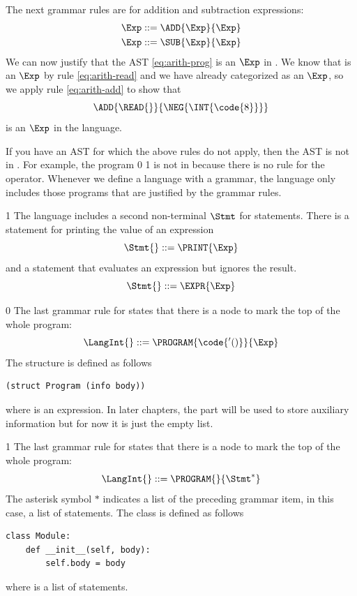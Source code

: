 \documentclass[7x10,nocrop]{TimesAPriori_MIT}%
\def\racketEd{0}
\def\pythonEd{1}
\def\edition{0}
\newcommand{\racket}[1]{{\if\edition\racketEd{#1}\fi}}
\newcommand{\python}[1]{{\if\edition\pythonEd #1\fi}}
\begin{document}
The next grammar rules are for addition and subtraction expressions:
\begin{align}
  \Exp &::= \ADD{\Exp}{\Exp} \label{eq:arith-add}\\
  \Exp &::= \SUB{\Exp}{\Exp} \label{eq:arith-sub}
\end{align}
We can now justify that the AST \eqref{eq:arith-prog} is an $\Exp$ in
\LangInt{}.  We know that \READ{} is an $\Exp$ by rule
\eqref{eq:arith-read} and we have already categorized
 as an $\Exp$, so we apply rule \eqref{eq:arith-add}
to show that
\[
\ADD{\READ{}}{\NEG{\INT{\code{8}}}}
\]
is an $\Exp$ in the \LangInt{} language.

If you have an AST for which the above rules do not apply, then the
AST is not in \LangInt{}. For example, the program \racket{} \python{} is not in \LangInt{}
because there is no rule for the \key{*} operator.  Whenever we
define a language with a grammar, the language only includes those
programs that are justified by the grammar rules.

{\if\edition\pythonEd
The language \LangInt{} includes a second non-terminal $\Stmt$ for statements.
There is a statement for printing the value of an expression
\[
\Stmt{} ::= \PRINT{\Exp}
\]
and a statement that evaluates an expression but ignores the result.
\[
\Stmt{} ::= \EXPR{\Exp}
\]
\fi}

{\if\edition\racketEd
The last grammar rule for \LangInt{} states that there is a
 node to mark the top of the whole program:
\[
  \LangInt{} ::= \PROGRAM{\code{'()}}{\Exp}
\]
The  structure is defined as follows
\begin{lstlisting}
(struct Program (info body))
\end{lstlisting}
where  is an expression. In later chapters, the 
part will be used to store auxiliary information but for now it is
just the empty list.
\fi}

{\if\edition\pythonEd
The last grammar rule for \LangInt{} states that there is a
 node to mark the top of the whole program:
\[
  \LangInt{} ::= \PROGRAM{}{\Stmt^{*}}
\]
The asterisk symbol $*$ indicates a list of the preceding grammar item, in
this case, a list of statements.
%
The  class is defined as follows
\begin{lstlisting}
class Module:
    def __init__(self, body):
        self.body = body
\end{lstlisting}
where  is a list of statements.
\fi}
\end{document}
